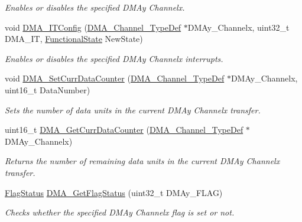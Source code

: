 \begin{DoxyCompactItemize}
\begin{DoxyCompactList}\small\item\em Enables or disables the specified D\+M\+Ay Channelx. \end{DoxyCompactList}\item 
void \mbox{\hyperlink{group___d_m_a___private___functions_ga0bb60360be9cd57f96399be2f3b5eb2b}{D\+M\+A\+\_\+\+I\+T\+Config}} (\mbox{\hyperlink{struct_d_m_a___channel___type_def}{D\+M\+A\+\_\+\+Channel\+\_\+\+Type\+Def}} $\ast$D\+M\+Ay\+\_\+\+Channelx, uint32\+\_\+t D\+M\+A\+\_\+\+IT, \mbox{\hyperlink{group___exported__types_gac9a7e9a35d2513ec15c3b537aaa4fba1}{Functional\+State}} New\+State)
\begin{DoxyCompactList}\small\item\em Enables or disables the specified D\+M\+Ay Channelx interrupts. \end{DoxyCompactList}\item 
void \mbox{\hyperlink{group___d_m_a___private___functions_gade5d9e532814eaa46514cb385fdff709}{D\+M\+A\+\_\+\+Set\+Curr\+Data\+Counter}} (\mbox{\hyperlink{struct_d_m_a___channel___type_def}{D\+M\+A\+\_\+\+Channel\+\_\+\+Type\+Def}} $\ast$D\+M\+Ay\+\_\+\+Channelx, uint16\+\_\+t Data\+Number)
\begin{DoxyCompactList}\small\item\em Sets the number of data units in the current D\+M\+Ay Channelx transfer. \end{DoxyCompactList}\item 
uint16\+\_\+t \mbox{\hyperlink{group___d_m_a___private___functions_ga511b4c402d1ff32d53f28736956cac5d}{D\+M\+A\+\_\+\+Get\+Curr\+Data\+Counter}} (\mbox{\hyperlink{struct_d_m_a___channel___type_def}{D\+M\+A\+\_\+\+Channel\+\_\+\+Type\+Def}} $\ast$D\+M\+Ay\+\_\+\+Channelx)
\begin{DoxyCompactList}\small\item\em Returns the number of remaining data units in the current D\+M\+Ay Channelx transfer. \end{DoxyCompactList}\item 
\mbox{\hyperlink{group___exported__types_ga89136caac2e14c55151f527ac02daaff}{Flag\+Status}} \mbox{\hyperlink{group___d_m_a___private___functions_gafb30b7a891834c267eefd5d30b688a9f}{D\+M\+A\+\_\+\+Get\+Flag\+Status}} (uint32\+\_\+t D\+M\+Ay\+\_\+\+F\+L\+AG)
\begin{DoxyCompactList}\small\item\em Checks whether the specified D\+M\+Ay Channelx flag is set or not. \end{DoxyCompactList}\item 

\end{DoxyCompactItemize}

